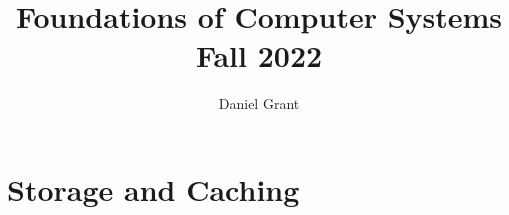 \documentclass{report}
\title{\Huge{Foundations of Computer Systems}\\Fall 2022}
\author{\huge{Daniel Grant}}
\date{}
\begin{document}
\maketitle
\newpage%
\tableofcontents
\pagebreak

\chapter{Storage and Caching}








\end{document}
